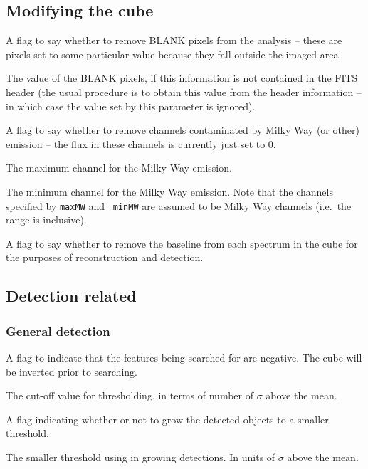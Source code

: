 \documentclass[12pt,a4paper]{article}
\newcommand{\ie}{i.e.\ }
\newcommand{\entrylabel}[1]{\mbox{\textsf{\bf{#1:}}}\hfil}
\newenvironment{entry}
        {\begin{list}{}%
                {\renewcommand{\makelabel}{\entrylabel}%
                        \setlength{\labelwidth}{30mm}%
                        \setlength{\labelsep}{5pt}%
                        \setlength{\itemsep}{2pt}%
                        \setlength{\parsep}{2pt}%
                        \setlength{\leftmargin}{35mm}%
                }%
        }%
{\end{list}}
\begin{document}
\subsection*{Modifying the cube}
\begin{entry}
\item[flagBlankPix {\tt [true]}] A flag to say whether to remove BLANK
  pixels from the analysis -- these are pixels set to some particular
  value because they fall outside the imaged area.
\item[blankPixValue {\tt [-8.00061]}] The value of the BLANK pixels,
  if this information is not contained in the FITS header (the usual
  procedure is to obtain this value from the header information -- in
  which case the value set by this parameter is ignored).
\item[flagMW {\tt [false]}] A flag to say whether to remove channels
  contaminated by Milky Way (or other) emission -- the flux in these
  channels is currently just set to 0.
\item[maxMW {\tt [112]}] The maximum channel for the Milky Way
  emission.
\item[minMW {\tt [75]}] The minimum channel for the Milky Way
  emission. Note that the channels specified by {\tt maxMW} and {\tt
  minMW} are assumed to be Milky Way channels (\ie the range is
  inclusive).
\item[flagBaseline {\tt [false]}] A flag to say whether to remove the
  baseline from each spectrum in the cube for the purposes of
  reconstruction and detection.
\end{entry}

\subsection*{Detection related}

\subsubsection*{General detection}
\begin{entry}
\item[flagNegative {\tt [false]}] A flag to indicate that the features
  being searched for are negative. The cube will be inverted prior to
  searching. 
\item[snrCut {\tt [3.]}] The cut-off value for thresholding, in terms
  of number of $\sigma$ above the mean.
\item[flagGrowth {\tt [true]}] A flag indicating whether or not to
  grow the detected objects to a smaller threshold.
\item[growthCut {\tt [2.]}] The smaller threshold using in growing
  detections. In units of $\sigma$ above the mean.
\end{entry}
\end{document}
